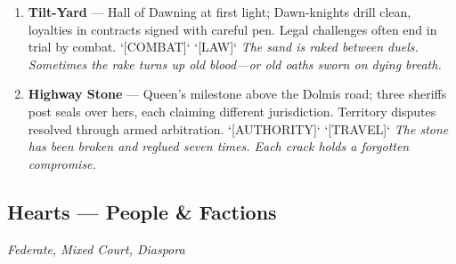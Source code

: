 \begin{enumerate}
\item[K] \textbf{Tilt-Yard} --- Hall of Dawning at first light; Dawn-knights drill clean, loyalties in contracts signed with careful pen. Legal challenges often end in trial by combat. `[COMBAT]` `[LAW]`
  \hfill \textit{The sand is raked between duels. Sometimes the rake turns up old blood---or old oaths sworn on dying breath.}
\item[A] \textbf{Highway Stone} --- Queen's milestone above the Dolmis road; three sheriffs post seals over hers, each claiming different jurisdiction. Territory disputes resolved through armed arbitration. `[AUTHORITY]` `[TRAVEL]`
  \hfill \textit{The stone has been broken and reglued seven times. Each crack holds a forgotten compromise.}
\end{enumerate}

\subsection{Hearts --- People \& Factions}
\label{sec:viterra-people}
\noindent\textit{Federate, Mixed Court, Diaspora}

